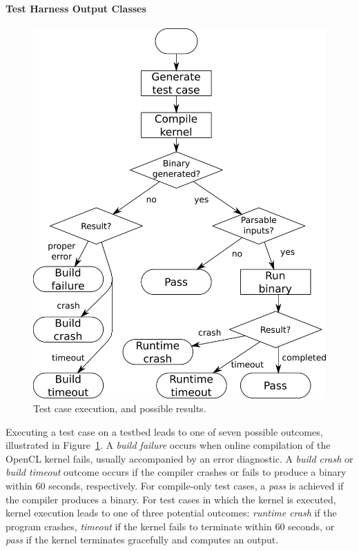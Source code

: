 
\paragraph*{Test Harness Output Classes}
\begin{figure}
  \centering %
  \includegraphics[width=.8\columnwidth]{img/testprocess-long}%
  \caption{%
 	  Test case execution, and possible results.%
     \vspace{-1.1em}
  }%
  \label{fig:test-process} %
\end{figure}
Executing a test case on a testbed leads to one of seven possible outcomes, illustrated in Figure~\ref{fig:test-process}.
A \emph{build failure} occurs when online compilation of the OpenCL kernel fails, usually accompanied by an error diagnostic.
A \emph{build crash} or \emph{build timeout} outcome occurs if the compiler crashes or fails to produce a binary within 60 seconds, respectively.
For compile-only test cases, a \emph{pass} is achieved if the compiler produces a binary.
For test cases in which the kernel is executed, kernel execution leads to one of three potential outcomes:
\emph{runtime crash} if the program crashes,
\emph{timeout} if the kernel fails to terminate within 60 seconds,
or \emph{pass} if the kernel terminates gracefully and computes an output.

